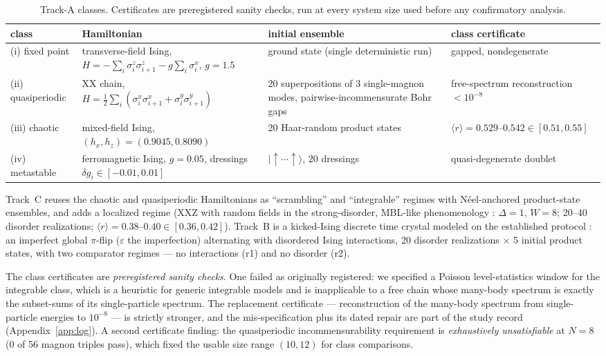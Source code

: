 \documentclass[a4paper,11pt,noarxiv]{quantumarticle}
\begin{document}
\begin{table}[t]
\centering\small
\begin{tabular}{@{}p{2.1cm}p{4.6cm}p{4.2cm}p{3.2cm}@{}}
\toprule
class & Hamiltonian & initial ensemble & class certificate \\
\midrule
(i) fixed point & transverse-field Ising, $H=-\sum_i
\sigma^z_i\sigma^z_{i+1} - g\sum_i\sigma^x_i$, $g=1.5$ & ground state
(single deterministic run) & gapped, nondegenerate \\
(ii) quasiperiodic & XX chain,
$H=\tfrac12\sum_i(\sigma^x_i\sigma^x_{i+1}+\sigma^y_i\sigma^y_{i+1})$ &
20 superpositions of 3 single-magnon modes, pairwise-incommensurate
Bohr gaps & free-spectrum reconstruction $<10^{-8}$ \\
(iii) chaotic & mixed-field Ising, $(h_x,h_z)=(0.9045,0.8090)$ & 20
Haar-random product states & $\langle r\rangle =
0.529\text{--}0.542 \in [0.51,0.55]$ \\
(iv) metastable & ferromagnetic Ising, $g=0.05$, dressings $\delta g_i
\in [-0.01,0.01]$ & $\lvert\uparrow\cdots\uparrow\rangle$, 20 dressings
& quasi-degenerate doublet \\
\bottomrule
\end{tabular}
\caption{Track-A classes. Certificates are preregistered sanity checks,
run at every system size used before any confirmatory analysis.}
\label{tab:classes}
\end{table}

Track~C reuses the chaotic and quasiperiodic Hamiltonians as
``scrambling'' and ``integrable'' regimes with N\'eel-anchored
product-state ensembles, and adds a localized regime (XXZ with random
fields in the strong-disorder, MBL-like phenomenology
\cite{SRC068}: $\Delta=1$, $W=8$; 20--40 disorder realizations;
$\langle r\rangle = 0.38$--$0.40 \in [0.36,0.42]$). Track~B is a kicked-Ising
discrete time crystal modeled on the established protocol
\cite{SRC043,SRC044}: an imperfect global $\pi$-flip ($\varepsilon$ the
imperfection) alternating with disordered Ising interactions, 20
disorder realizations $\times$ 5 initial product states, with two
comparator regimes --- no interactions (r1) and no disorder (r2).

The class certificates are \emph{preregistered sanity checks}. One
failed as originally registered: we specified a Poisson
level-statistics window for the integrable class, which is a heuristic
for generic integrable models and is inapplicable to a free chain whose
many-body spectrum is exactly the subset-sums of its single-particle
spectrum. The replacement certificate --- reconstruction of the
many-body spectrum from single-particle energies to $10^{-8}$ --- is
strictly stronger, and the mis-specification plus its dated repair are
part of the study record (Appendix~\ref{app:log}). A second certificate
finding: the quasiperiodic incommensurability requirement is
\emph{exhaustively unsatisfiable} at $N=8$ (0 of 56 magnon triples
pass), which fixed the usable size range $(10, 12)$ for class
comparisons.
\end{document}
